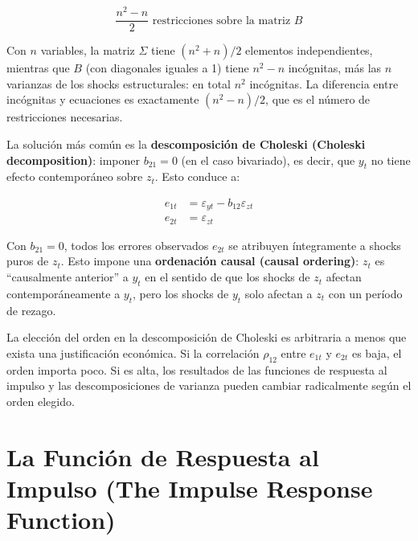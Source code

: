 \documentclass[12pt]{article}
\begin{document}
\begin{equation}
\frac{n^2 - n}{2} \text{ restricciones sobre la matriz } B
\end{equation}

\begin{intuicionmat}
Con $n$ variables, la matriz $\Sigma$ tiene $(n^2+n)/2$ elementos independientes, mientras que $B$ (con diagonales iguales a 1) tiene $n^2 - n$ inc\'ognitas, m\'as las $n$ varianzas de los shocks estructurales: en total $n^2$ inc\'ognitas. La diferencia entre inc\'ognitas y ecuaciones es exactamente $(n^2-n)/2$, que es el n\'umero de restricciones necesarias.
\end{intuicionmat}

La soluci\'on m\'as com\'un es la \textbf{descomposici\'on de Choleski (Choleski decomposition)}: imponer $b_{21} = 0$ (en el caso bivariado), es decir, que $y_t$ no tiene efecto contempor\'aneo sobre $z_t$. Esto conduce a:

\begin{align}
e_{1t} &= \varepsilon_{yt} - b_{12}\varepsilon_{zt} \\
e_{2t} &= \varepsilon_{zt}
\end{align}

\begin{intuicionmat}
Con $b_{21}=0$, todos los errores observados $e_{2t}$ se atribuyen \'integramente a shocks puros de $z_t$. Esto impone una \textbf{ordenaci\'on causal (causal ordering)}: $z_t$ es ``causalmente anterior'' a $y_t$ en el sentido de que los shocks de $z_t$ afectan contempor\'aneamente a $y_t$, pero los shocks de $y_t$ solo afectan a $z_t$ con un per\'iodo de rezago.
\end{intuicionmat}

\begin{intuicion}
La elecci\'on del orden en la descomposici\'on de Choleski es arbitraria a menos que exista una justificaci\'on econ\'omica. Si la correlaci\'on $\rho_{12}$ entre $e_{1t}$ y $e_{2t}$ es baja, el orden importa poco. Si es alta, los resultados de las funciones de respuesta al impulso y las descomposiciones de varianza pueden cambiar radicalmente seg\'un el orden elegido.
\end{intuicion}

\section{La Funci\'on de Respuesta al Impulso (The Impulse Response Function)}
\end{document}
